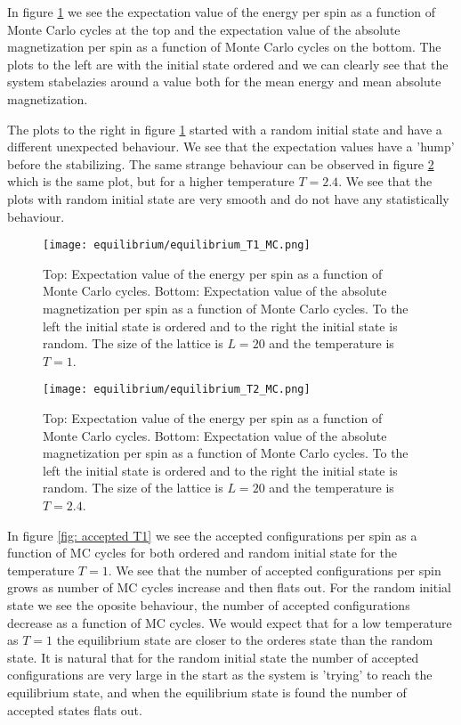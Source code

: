 \documentclass[11pt,a4wide]{article}
\begin{document}
In figure \ref{fig: equilibrium T1} we see the expectation value of the energy per spin as a function of Monte Carlo cycles at the top and the expectation value of the absolute magnetization per spin as a function of Monte Carlo cycles on the bottom. The plots to the left are with the initial state ordered and we can clearly see that the system stabelazies around a value both for the mean energy and mean absolute magnetization. 

The plots to the right in figure \ref{fig: equilibrium T1} started with a random initial state and have a different unexpected behaviour. We see that the expectation values have a 'hump' before the stabilizing. The same strange behaviour can be observed in figure \ref{fig: equilibrium T2} which is the same plot, but for a higher temperature $T=2.4$. We see that the plots with random initial state are very smooth and do not have any statistically behaviour. 

\begin{figure}[htp]
\centering
\texttt{[image: equilibrium/equilibrium\_T1\_MC.png]}
\caption{Top: Expectation value of the energy per spin as a function of Monte Carlo cycles. Bottom:  Expectation value of the absolute magnetization per spin as a function of Monte Carlo cycles. To the left the initial state is ordered and to the right the initial state is random. The size of the lattice is $L=20$ and the temperature is $T=1$.}
\label{fig: equilibrium T1}
\end{figure}

\begin{figure}[htp]
\centering
\texttt{[image: equilibrium/equilibrium\_T2\_MC.png]}
\caption{Top: Expectation value of the energy per spin as a function of Monte Carlo cycles. Bottom:  Expectation value of the absolute magnetization per spin as a function of Monte Carlo cycles. To the left the initial state is ordered and to the right the initial state is random. The size of the lattice is $L=20$ and the temperature is $T=2.4$.}
\label{fig: equilibrium T2}
\end{figure}

In figure \ref{fig: accepted T1} we see the accepted configurations per spin as a function of MC cycles for both ordered and random initial state for the temperature $T=1$. We see that the number of accepted configurations per spin grows as number of MC cycles increase and then flats out. For the random initial state we see the oposite behaviour, the number of accepted configurations decrease as a function of MC cycles. We would expect that for a low temperature as $T=1$ the equilibrium state are closer to the orderes state than the random state. It is natural that for the random initial state the number of accepted configurations are very large in the start as the system is 'trying' to reach the equilibrium state, and when the equilibrium state is found the number of accepted states flats out. 
\end{document}

